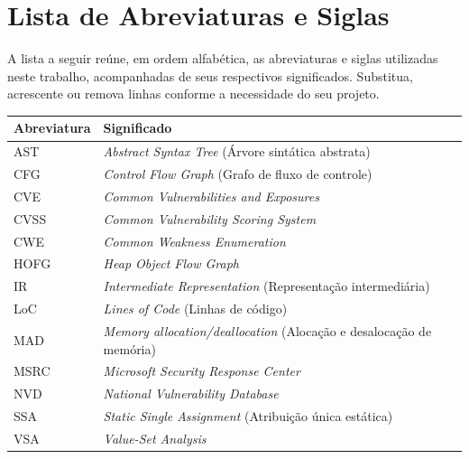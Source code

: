 \documentclass[
    12pt,                %
    openright,           %
    oneside,             %
    a4paper,             %
    english,             %
    brazil               %
]{abntex2}
\begin{document}
\chapter*{Lista de Abreviaturas e Siglas}

\noindent A lista a seguir reúne, em ordem alfabética, as abreviaturas e siglas utilizadas neste trabalho, acompanhadas de seus respectivos significados. Substitua, acrescente ou remova linhas conforme a necessidade do seu projeto.

\vspace{\onelineskip}

\begin{center}
\begin{tabular}{@{}p{3.2cm}p{}@{}}
\toprule
\textbf{Abreviatura} & \textbf{Significado} \\
\midrule
AST & \textit{Abstract Syntax Tree} (Árvore sintática abstrata) \\
CFG & \textit{Control Flow Graph} (Grafo de fluxo de controle) \\
CVE & \textit{Common Vulnerabilities and Exposures} \\
CVSS & \textit{Common Vulnerability Scoring System} \\
CWE & \textit{Common Weakness Enumeration} \\
HOFG & \textit{Heap Object Flow Graph} \\
IR & \textit{Intermediate Representation} (Representação intermediária) \\
LoC & \textit{Lines of Code} (Linhas de código) \\
MAD & \textit{Memory allocation/deallocation} (Alocação e desalocação de memória) \\
MSRC & \textit{Microsoft Security Response Center} \\
NVD & \textit{National Vulnerability Database} \\
SSA & \textit{Static Single Assignment} (Atribuição única estática)\\
VSA & \textit{Value-Set Analysis} \\
\bottomrule
\end{tabular}
\end{center}

\cleardoublepage


\tableofcontents*
\cleardoublepage
\end{document}
